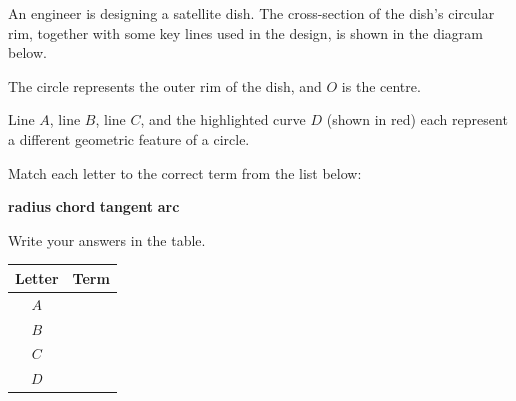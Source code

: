 \documentclass[11pt]{article}
\begin{document}
\begin{question}
\noindent An engineer is designing a satellite dish. The cross-section of the dish's circular rim, together with some key lines used in the design, is shown in the diagram below.

\begin{center}
\end{center}

\noindent The circle represents the outer rim of the dish, and $O$ is the centre.

\noindent Line $A$, line $B$, line $C$, and the highlighted curve $D$ (shown in red) each represent a different geometric feature of a circle.

\noindent Match each letter to the correct term from the list below:

\begin{center}
\textbf{radius} \quad \textbf{chord} \quad \textbf{tangent} \quad \textbf{arc}
\end{center}

\vspace{0.3cm}
\noindent Write your answers in the table.

\begin{center}
\renewcommand{\arraystretch}{1.6}
\begin{tabular}{|c|c|}
\hline
Letter & Term \\
\hline
$A$ & \\
\hline
$B$ & \\
\hline
$C$ & \\
\hline
$D$ & \\
\hline
\end{tabular}
\end{center}

\vspace{2.5cm}
\begin{flushright}
\end{flushright}
\end{question}
\end{document}
